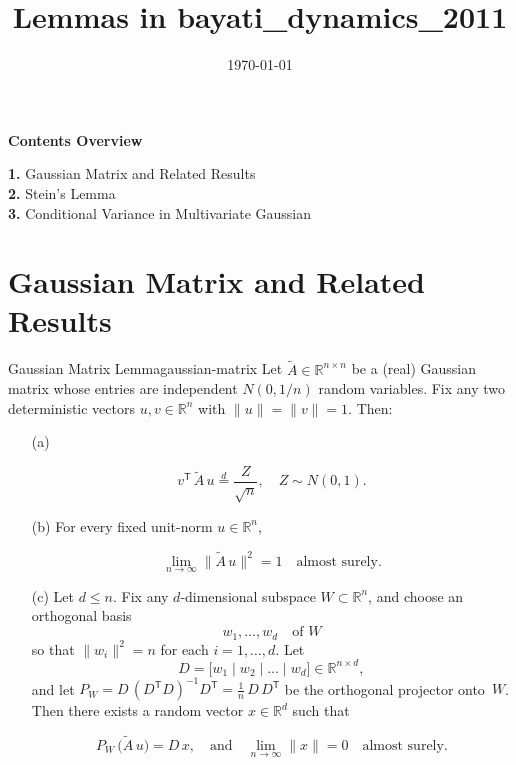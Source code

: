 \documentclass[11pt]{article}
\title{\Huge\textcolor{titlecolor}{\textbf{Lemmas in bayati\_dynamics\_2011}}}
\date{\today}
\newcommand{\R}{\mathbb{R}}
\newcommand{\norm}[1]{\|#1\|}
\begin{document}
\maketitle

\begin{center}
\begin{tcolorbox}[width=0.8\textwidth,colback=blue!5!white,colframe=blue!50!black,arc=5pt]
\centering
\textbf{\Large Contents Overview}
\vspace{0.5cm}

\textbf{1.} Gaussian Matrix and Related Results\\
\textbf{2.} Stein's Lemma\\
\textbf{3.} Conditional Variance in Multivariate Gaussian
\end{tcolorbox}
\end{center}


\section{Gaussian Matrix and Related Results}

\begin{lemma}{Gaussian Matrix Lemma}{gaussian-matrix}
Let $\tilde{A}\in\R^{n\times n}$ be a (real) Gaussian matrix whose entries are independent $N(0,1/n)$ random variables. Fix any two deterministic vectors $u,v\in\R^n$ with $\norm{u}=\norm{v}=1$. Then:

\begin{enumerate}
\item[(a)] 
\begin{tcolorbox}[mathbox]
\[
v^{\mathsf{T}}\,\tilde{A}\,u 
\overset{d}{=}\frac{Z}{\sqrt{n}}, 
\quad Z\sim N(0,1).
\]
\end{tcolorbox}

\item[(b)] For every fixed unit-norm $u\in\R^n$,
\begin{tcolorbox}[mathbox]
\[
\lim_{n\to\infty}\norm{\tilde{A}\,u}^2 
= 1 
\quad\text{almost surely.}
\]
\end{tcolorbox}

\item[(c)] Let $d\leq n$. Fix any $d$-dimensional subspace $W\subset\R^n$, and choose an orthogonal basis 
\[
w_1,\dots,w_d \quad\text{of }W
\]
so that $\norm{w_i}^2 = n$ for each $i=1,\dots,d$. Let 
\[
D = \bigl[w_1 \;|\; w_2 \;|\;\dots\;|\; w_d\bigr]\in\R^{n\times d},
\]
and let $P_W = D\,(D^{\mathsf{T}}D)^{-1}D^{\mathsf{T}} = \frac{1}{n}\,D\,D^{\mathsf{T}}$ be the orthogonal projector onto~$W$. Then there exists a random vector $x\in\R^d$ such that
\begin{tcolorbox}[mathbox]
\[
P_W\,\bigl(\tilde{A}\,u\bigr) = D\,x,
\quad\text{and}\quad
\lim_{n\to\infty} \norm{x} = 0 
\quad\text{almost surely.}
\]
\end{tcolorbox}
\end{enumerate}
\end{lemma}
\end{document}
